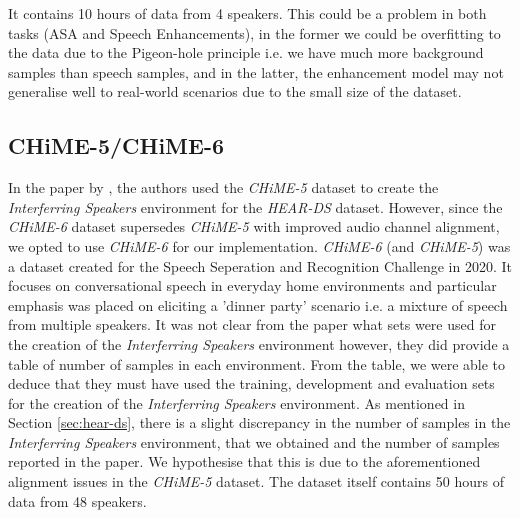 \documentclass[logo,bsc,singlespacing,parskip,online]{infthesis}
\newcommand{\heards}{\textit{HEAR-DS}\xspace}
\newcommand{\chime}[1]{\textit{CHiME-#1}\xspace}
\begin{document}
It contains 10 hours of data from 4 speakers. This could be a problem in both tasks (ASA and Speech Enhancements), in the former
we could be overfitting to the data due to the Pigeon-hole principle i.e. we have much more background samples than speech samples, 
and in the latter, the enhancement model may not generalise well to real-world scenarios due to the small size of the dataset. 


\subsection{CHiME-5/CHiME-6}
In the paper by \citet{Huwel2020HearDS}, the authors used the \chime{5} dataset to create the \textit{Interferring Speakers} environment for the \heards dataset.
However, since the \chime{6} dataset supersedes \chime{5} with improved audio channel alignment, we opted to use \chime{6} for our implementation.
\chime{6} (and \chime{5}) was a dataset created for the Speech Seperation and Recognition Challenge in 2020. It 
focuses on conversational speech in everyday home environments and particular emphasis was placed on 
eliciting a 'dinner party' scenario i.e. a mixture of speech from multiple speakers. It was not 
clear from the paper what sets were used for the creation of the \textit{Interferring Speakers} environment 
however, they did provide a table of number of samples in each environment. From the table, we 
were able to deduce that they must have used the training, development and evaluation sets for the creation of the \textit{Interferring Speakers} environment.
As mentioned in Section \ref{sec:hear-ds}, there is a slight discrepancy in the number of samples in the \textit{Interferring Speakers} environment, 
that we obtained and the number of samples reported in the paper. We hypothesise that this is due to the aforementioned alignment issues in the \chime{5} dataset.
The dataset itself contains 50 hours of data from 48 speakers.
\end{document}
